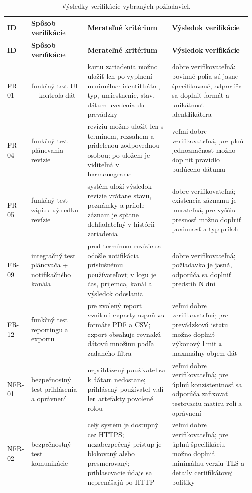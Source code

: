 \footnotesize
\begin{longtable}{|p{1.8cm}|p{3.2cm}|p{4.3cm}|p{5.0cm}|}
\caption{Výsledky verifikácie vybraných požiadaviek}\label{tab:verification-requirements}\\
\hline
\textbf{ID} & \textbf{Spôsob verifikácie} & \textbf{Merateľné kritérium} & \textbf{Výsledok verifikácie} \\
\hline
\endfirsthead
\hline
\textbf{ID} & \textbf{Spôsob verifikácie} & \textbf{Merateľné kritérium} & \textbf{Výsledok verifikácie} \\
\hline
\endhead
FR-01 & funkčný test UI + kontrola dát & kartu zariadenia možno uložiť len po vyplnení minimálne: identifikátor, typ, umiestnenie, stav, dátum uvedenia do prevádzky & dobre verifikovateľná; povinné polia sú jasne špecifikované, odporúča sa doplniť formát a unikátnosť identifikátora \\
\hline
FR-04 & funkčný test plánovania revízie & revíziu možno uložiť len s termínom, rozsahom a pridelenou zodpovednou osobou; po uložení je viditeľná v harmonograme & veľmi dobre verifikovateľná; pre plnú jednoznačnosť možno doplniť pravidlo budúceho dátumu \\
\hline
FR-05 & funkčný test zápisu výsledku revízie & systém uloží výsledok revízie vrátane stavu, poznámky a príloh; záznam je spätne dohľadateľný v histórii zariadenia & dobre verifikovateľná; existencia záznamu je merateľná, pre vyššiu presnosť možno doplniť povinnosť a typ príloh \\
\hline
FR-09 & integračný test plánovača + notifikačného kanála & pred termínom revízie sa odošle notifikácia príslušnému používateľovi; v logu je čas, príjemca, kanál a výsledok odoslania & dobre verifikovateľná; požiadavka je jasná, odporúča sa doplniť predstih N dní \\
\hline
FR-12 & funkčný test reportingu a exportu & pre zvolený report vzniknú exporty aspoň vo formáte PDF a CSV; export obsahuje rovnakú dátovú množinu podľa zadaného filtra & veľmi dobre verifikovateľná; pre prevádzkovú istotu možno doplniť výkonový limit a maximálny objem dát \\
\hline
NFR-01 & bezpečnostný test prihlásenia a oprávnení & neprihlásený používateľ sa k dátam nedostane; prihlásený používateľ vidí len artefakty povolené rolou & veľmi dobre verifikovateľná; pre úplnú konzistentnosť sa odporúča zafixovať testovaciu maticu rolí a oprávnení \\
\hline
NFR-02 & bezpečnostný test komunikácie & celý systém je dostupný cez HTTPS; nezabezpečený prístup je blokovaný alebo presmerovaný; prihlasovacie údaje sa neprenášajú po HTTP & veľmi dobre verifikovateľná; pre úplnú špecifikáciu možno doplniť minimálnu verziu TLS a detaily certifikátovej politiky \\

\end{longtable}
